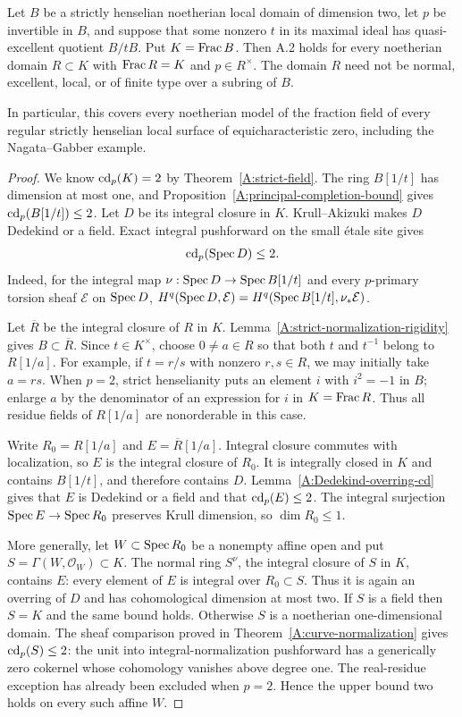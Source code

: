 \begin{theorem}
\label{A:A2-all-surface-models}
Let $B$ be a strictly henselian noetherian local domain of dimension
two, let $p$ be invertible in $B$, and suppose that some nonzero
$t$ in its maximal ideal has quasi-excellent quotient $B/tB$.
Put $K=\operatorname{Frac} B$. Then A.2 holds for every noetherian domain
$R\subset K$ with $\operatorname{Frac} R=K$ and $p\in R^\times$.
The domain $R$ need not be normal, excellent, local, or of finite
type over a subring of $B$.

In particular, this covers every noetherian model of the fraction
field of every regular strictly henselian local surface of
equicharacteristic zero, including the Nagata--Gabber example.
\end{theorem}
\begin{proof}
We know $\operatorname{cd}_p(K)=2$ by Theorem~\ref{A:strict-field}.
The ring $B[1/t]$ has dimension at most one, and
Proposition~\ref{A:principal-completion-bound} gives
$\operatorname{cd}_p(B[1/t])\leq2$. Let $D$ be its integral closure in $K$.
Krull--Akizuki makes $D$ Dedekind or a field. Exact integral
pushforward on the small \'etale site gives
\[
 \operatorname{cd}_p(\operatorname{Spec} D)\leq2.
\]
Indeed, for the integral map $\nu:\operatorname{Spec} D\to\operatorname{Spec} B[1/t]$
and every $p$-primary torsion sheaf $\mathcal E$ on $\operatorname{Spec} D$,
$H^q(\operatorname{Spec} D,\mathcal E)=
H^q(\operatorname{Spec} B[1/t],\nu_*\mathcal E)$.

Let $\overline R$ be the integral closure of $R$ in $K$.
Lemma~\ref{A:strict-normalization-rigidity} gives
$B\subset\overline R$. Since $t\in K^\times$, choose
$0\neq a\in R$ so that both $t$ and $t^{-1}$ belong to $R[1/a]$.
For example, if $t=r/s$ with nonzero $r,s\in R$, we may initially
take $a=rs$. When $p=2$, strict henselianity puts an element
$i$ with $i^2=-1$ in $B$; enlarge $a$ by the denominator of an
expression for $i$ in $K=\operatorname{Frac} R$. Thus all residue fields of
$R[1/a]$ are nonorderable in this case.

Write $R_0=R[1/a]$ and $E=\overline R[1/a]$.
Integral closure commutes with localization, so $E$ is the
integral closure of $R_0$. It is integrally closed in $K$ and
contains $B[1/t]$, and therefore contains $D$.
Lemma~\ref{A:Dedekind-overring-cd} gives that $E$ is Dedekind
or a field and that $\operatorname{cd}_p(E)\leq2$.
The integral surjection $\operatorname{Spec} E\to\operatorname{Spec} R_0$ preserves
Krull dimension, so $\dim R_0\leq1$.

More generally, let $W\subset\operatorname{Spec} R_0$ be a nonempty affine
open and put $S=\Gamma(W,\mathcal O_W)\subset K$.
The normal ring $S^\nu$, the integral closure of $S$ in $K$,
contains $E$: every element of $E$ is integral over $R_0\subset S$.
Thus it is again an overring of $D$ and has cohomological
dimension at most two. If $S$ is a field then $S=K$ and the same
bound holds. Otherwise $S$ is a noetherian one-dimensional domain.
The sheaf comparison proved in
Theorem~\ref{A:curve-normalization} gives $\operatorname{cd}_p(S)\leq2$:
the unit into integral-normalization pushforward has a generically
zero cokernel whose cohomology vanishes above degree one.
The real-residue exception has already been excluded when $p=2$.
Hence the upper bound two holds on every such affine $W$.


\end{proof}
